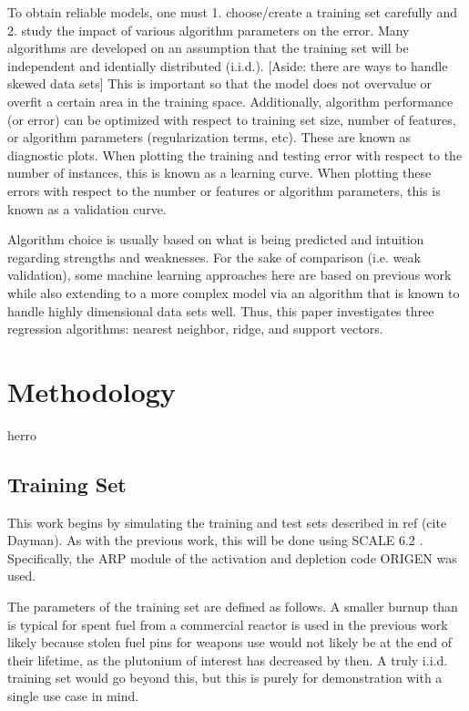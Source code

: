\documentclass{anstrans}
\begin{document}
To obtain reliable models, one must 1. choose/create a training set carefully
and 2. study the impact of various algorithm parameters on the error. Many
algorithms are developed on an assumption that the training set will be
independent and identially distributed (i.i.d.). [Aside: there are ways to
handle skewed data sets] This is important so that the model does not overvalue
or overfit a certain area in the training space. Additionally, algorithm
performance (or error) can be optimized with respect to training set size,
number of features, or algorithm parameters (regularization terms, etc).  These
are known as diagnostic plots. When plotting the training and testing error
with respect to the number of instances, this is known as a learning curve.
When plotting these errors with respect to the number or features or algorithm
parameters, this is known as a validation curve. 

Algorithm choice is usually based on what is being predicted and intuition
regarding strengths and weaknesses.  For the sake of comparison (i.e. weak
validation), some machine learning approaches here are based on previous
work \cite{dayman_2013} while also extending to a more complex model via an
algorithm that is known to handle highly dimensional data sets well. Thus, this
paper investigates three regression algorithms: nearest neighbor, ridge, and
support vectors.

\section{Methodology}
herro 

\subsection{Training Set}
This work begins by simulating the training and test sets described in ref
(cite Dayman). As with the previous work, this will be done using SCALE 6.2
\cite{scale}. Specifically, the ARP module of the activation and depletion code
ORIGEN was used. \cite{origen}

The parameters of the training set are defined as follows. A smaller burnup
than is typical for spent fuel from a commercial reactor is used in the
previous work likely because stolen fuel pins for weapons use would not likely
be at the end of their lifetime, as the plutonium of interest has decreased by
then. A truly i.i.d. training set would go beyond this, but this is purely for
demonstration with a single use case in mind. 
\end{document}
